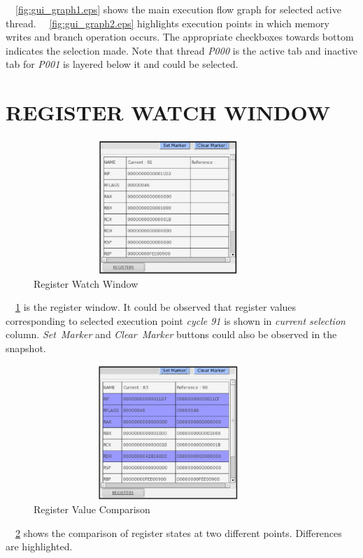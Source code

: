 ~\figurename~{\ref{fig:gui_graph1.eps}} shows the main execution flow graph for selected active thread.  
~\figurename~{\ref{fig:gui_graph2.eps}} highlights execution points in which memory writes and branch operation occurs. The appropriate checkboxes towards bottom indicates the selection made. Note that thread {\it P000} is the active tab and inactive tab for {\it P001} is layered below it and could be selected.
\section {REGISTER WATCH WINDOW}
\begin{figure}[h]
\centering
\includegraphics[width=4in, height=2in]{./figures/gui_reg1.eps}
\caption{Register Watch Window}
\label{fig:gui_reg1.eps}
\end{figure}
~\figurename~{\ref{fig:gui_reg1.eps}} is the register window. It could be observed that register values corresponding to selected execution point {\it cycle 91} is shown in {\it current selection} column. {\it Set~Marker} and {\it Clear~Marker} buttons could also be observed in the snapshot.
\begin{figure}[h]
\centering
\includegraphics[width=4in, height=2in]{./figures/gui_reg2.eps}
\caption{Register Value Comparison}
\label{fig:gui_reg2.eps}
\end{figure}
~\figurename~{\ref{fig:gui_reg2.eps}} shows the comparison of register states at two different points. Differences are highlighted.
